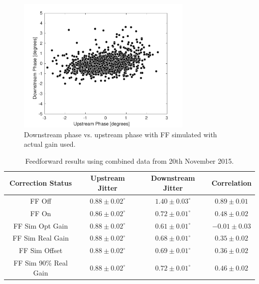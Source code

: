 \begin{figure}
  \centering
  \includegraphics[width=0.75\textwidth]{Figures/feedforward/longFF_scatterFFSimReal}
  \caption{Downstream phase vs. upstream phase with FF simulated with actual gain used.}
  \label{f:longFF_scatterFFSimReal}
\end{figure}

\begin{table}
  \begin{center}
    \begin{tabular}{| c | c | c | c |}
	   \hline
       Correction Status & Upstream Jitter & Downstream Jitter & Correlation \\ \hline
       FF Off & \(0.88\pm0.02^\circ\) & \(1.40\pm0.03^\circ\) & \(0.89\pm0.01\) \\
	   FF On & \(0.86\pm0.02^\circ\) & \(0.72\pm0.01^\circ\) & \(0.48\pm0.02\) \\
	   FF Sim Opt Gain & \(0.88\pm0.02^\circ\) & \(0.61\pm0.01^\circ\) & \(-0.01\pm0.03\) \\
	   FF Sim Real Gain & \(0.88\pm0.02^\circ\) & \(0.68\pm0.01^\circ\) & \(0.35\pm0.02\) \\
	   FF Sim Offset & \(0.88\pm0.02^\circ\) & \(0.69\pm0.01^\circ\) & \(0.36\pm0.02\) \\
	   FF Sim 90\% Real Gain & \(0.88\pm0.02^\circ\) & \(0.72\pm0.01^\circ\) & \(0.46\pm0.02\) \\ \hline
    \end{tabular}
    \caption{Feedforward results using combined data from 20th November 2015.}
  	\label{t:LongFF}
  \end{center}
\end{table}




